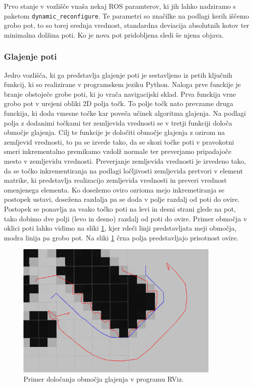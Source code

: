 \documentclass[10pt,a4paper]{article}
\begin{document}
Prvo stanje v vozlišče vnaša nekaj ROS paramterov, ki jih lahko nadziramo s paketom \newline \texttt{dynamic\_reconfigure}. Te parametri so značilke na podlagi kerih iščemo grobo pot, to so torej srednja vrednost, standardna deviacija absolutnih kotov ter minimalna dolžina poti. Ko je nova pot pridobljena sledi še njena objava.

\subsubsection{Glajenje poti}

Jedro vozlišča, ki ga predstavlja glajenje poti je sestavljeno iz petih ključnih funkcij, ki so realizirane v programskem jeziku Python. Naloga prve funckije je branje obstoječe grobe poti, ki jo vrača navigacijski sklad. Prva funckija vrne grobo pot v urejeni obliki 2D polja točk. To polje točk nato prevzame druga funckija, ki doda vmesne točke kar poveča učinek algoritma glajenja. Na podlagi polja z dodanimi točkami ter zemljevida vrednosti se v tretji funkciji določa območje glajenja. Cilj te funkcije je določiti območje glajenja z ozirom na zemljevid vrednosti, to pa se izvede tako, da se skozi točke poti v pravokotni smeri inkrementalno premikamo vzdolž normale ter preverjamo pripadajoče mesto v zemljevidu vrednosti. Preverjanje zemljevida vrednosti je izvedeno tako, da se točko inkrementiranja na podlagi ločljivosti zemljevida pretvori v element matrike, ki predstavlja realizacijo zemljevida vrednosti in preveri vrednost omenjenega elementa. Ko dosežemo oviro ozrioma mejo inkremetiranja se postopek ustavi, dosežena razdalja pa se doda v polje razdalj od poti do ovire. Postopek se ponavlja za vsako točko poti na levi in desni strani glede na pot, tako dobimo dve polji (levo in desno) razdalj od poti do ovire. Primer območja v oklici poti lahko vidimo na sliki \ref{fig:slika_obm}, kjer rdeči linji predstavljata meji območja, modra linija pa grobo pot. Na sliki \ref{fig:slika_obm} črna polja predstavljajo prisotnost ovire.

\begin{figure}[H]
	\centering
	\includegraphics[width=10cm]{pic/obmocje.png}
	\caption{Primer določanja območja glajenja v programu RViz.}
	\label{fig:slika_obm}
\end{figure}
\end{document}

